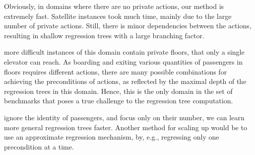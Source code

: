\documentclass[letterpaper]{article}
\theoremstyle{definition}
\begin{document}
Obviously, in domains where there are no private actions, our method is extremely fast.
Satellite instances took much time, mainly due to the large number of private actions. Still, there is minor dependencies between the actions, resulting in shallow regression trees with a large branching factor.

\begin{table}[t!]
\centering
\footnotesize
{}
\caption{Projection computation metrics over a large problem from each domain.}
\label{tbl:projection}
\end{table}


more difficult instances of this domain contain private floors, that only a single elevator can reach. As boarding and exiting various quantities of passengers in floors requires different actions,  there are many possible combinations for achieving the preconditions of actions, as reflected by the maximal depth of the regression trees in this domain. Hence, this is the only domain in the set of benchmarks that poses a true challenge to the regression tree computation.

ignore the identity of passengers, and focus only on their number, we can learn more general regression trees faster. Another method for scaling up would be to use an approximate regression mechanism, by, e.g., regressing only one precondition at a time.
\end{document}

